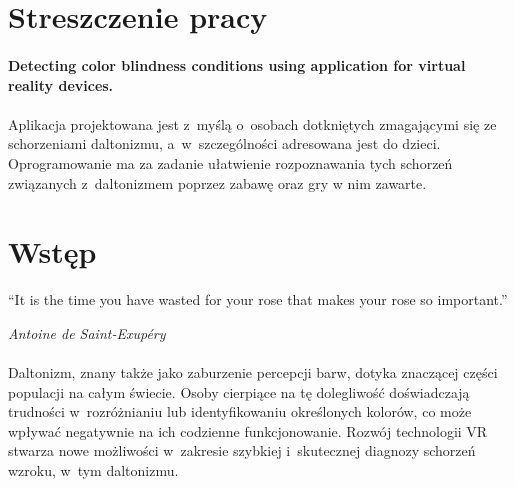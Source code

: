 \documentclass[12pt, letterpaper]{article}
\begin{document}
\setlength{\parindent}{1cm}
\newpage

\section{Streszczenie pracy}
\paragraph{}
\textbf{Detecting color blindness conditions using application for virtual reality devices.}

\paragraph{}
Aplikacja projektowana jest z~myślą o~osobach dotkniętych zmagającymi się ze schorzeniami daltonizmu, a~w~szczególności adresowana jest do dzieci. Oprogramowanie ma za zadanie ułatwienie rozpoznawania tych schorzeń związanych z~daltonizmem poprzez zabawę oraz gry w nim zawarte. 

\newpage
\tableofcontents

\newpage

\section{Wstęp}

\epigraph{“It is the time you have wasted for your rose that makes your rose so important.”}{\textit{Antoine de Saint-Exupéry}}

\paragraph{}
Daltonizm, znany także jako zaburzenie percepcji barw, dotyka znaczącej części populacji na całym świecie. Osoby cierpiące na tę dolegliwość doświadczają trudności w~rozróżnianiu lub identyfikowaniu określonych kolorów, co może wpływać negatywnie na ich codzienne funkcjonowanie. Rozwój technologii VR stwarza nowe możliwości w~zakresie szybkiej i~skutecznej diagnozy schorzeń wzroku, w~tym daltonizmu. 
\end{document}
